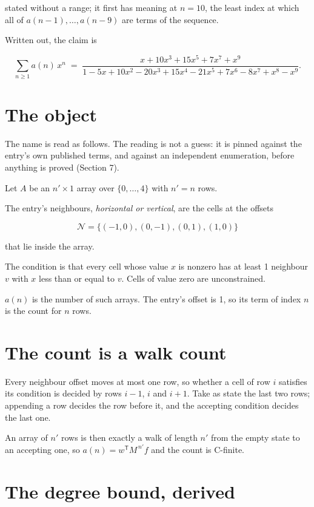 \documentclass[11pt]{article}
\theoremstyle{definition}
\begin{document}
stated without a range; it first has meaning at $n = 10$, the least index at which all of $a(n-1),\dots,a(n-9)$ are terms of the sequence.

Written out, the claim is

\[\sum_{n \ge 1} a(n)\,x^n \;=\; \frac{x + 10x^{3} + 15x^{5} + 7x^{7} + x^{9}}{1 - 5x + 10x^{2} - 20x^{3} + 15x^{4} - 21x^{5} + 7x^{6} - 8x^{7} + x^{8} - x^{9}}.\]

\section{The object}

The name is read as follows. The reading is not a guess: it is pinned against the entry's own published terms, and against an independent enumeration, before anything is proved (Section 7).

Let $A$ be an $n' \times 1$ array over $\{0,\dots,4\}$ with $n' = n$ rows.

The entry's neighbours, {\itshape horizontal or vertical}, are the cells at the offsets

\[\mathcal{N} = \{(-1,0), (0,-1), (0,1), (1,0)\}\]

that lie inside the array.

The condition is that every cell whose value $x$ is nonzero has at least 1 neighbour $v$ with $x$ less than or equal to $v$. Cells of value zero are unconstrained.

$a(n)$ is the number of such arrays. The entry's offset is 1, so its term of index $n$ is the count for $n$ rows.

\section{The count is a walk count}

Every neighbour offset moves at most one row, so whether a cell of row $i$ satisfies its condition is decided by rows $i-1$, $i$ and $i+1$. Take as state the last two rows; appending a row decides the row before it, and the accepting condition decides the last one.

An array of $n'$ rows is then exactly a walk of length $n'$ from the empty state to an accepting one, so $a(n) = w^{\mathsf T}M^{\,n'}f$ and the count is C-finite.

\section{The degree bound, derived}
\end{document}
